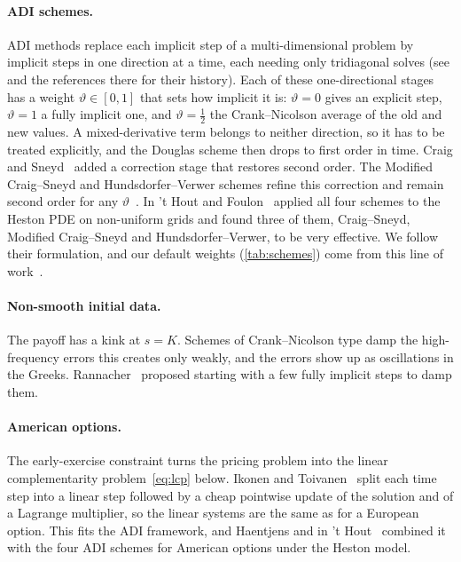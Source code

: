 \documentclass[11pt]{article}
\begin{document}
\paragraph{ADI schemes.}
ADI methods replace each implicit step of a multi-dimensional problem by implicit steps in one direction at a
time, each needing only tridiagonal solves (see \cite{inthout2010} and the references there for their
history). Each of these one-directional stages has a weight $\vartheta\in[0,1]$ that sets how implicit it is:
$\vartheta=0$ gives an explicit step, $\vartheta=1$ a fully implicit one, and $\vartheta=\tfrac12$ the
Crank--Nicolson average of the old and new values. A mixed-derivative term belongs to neither direction, so it has to be treated explicitly, and the
Douglas scheme then drops to first order in time. Craig and Sneyd~\cite{craig1988} added a correction stage
that restores second order. The Modified Craig--Sneyd and Hundsdorfer--Verwer schemes refine this correction
and remain second order for any $\vartheta$~\cite{inthout2010}. In 't Hout and
Foulon~\cite{inthout2010} applied all four schemes to the Heston PDE on non-uniform grids and found three of
them, Craig--Sneyd, Modified Craig--Sneyd and Hundsdorfer--Verwer, to be very effective. We follow their
formulation, and our default weights (\cref{tab:schemes}) come from this line of
work~\cite{inthout2010,haentjens2015}.

\paragraph{Non-smooth initial data.}
The payoff has a kink at $s=K$. Schemes of Crank--Nicolson type damp the high-frequency errors this creates only
weakly, and the errors show up as oscillations in the Greeks. Rannacher~\cite{rannacher1984} proposed starting
with a few fully implicit steps to damp them.

\paragraph{American options.}
The early-exercise constraint turns the pricing problem into the linear complementarity
problem~\eqref{eq:lcp} below. Ikonen and Toivanen~\cite{ikonen2009} split each time step into a linear step
followed by a cheap pointwise update of the solution and of a Lagrange multiplier, so the linear systems are
the same as for a European option. This fits the ADI framework, and Haentjens and in 't
Hout~\cite{haentjens2015} combined it with the four ADI schemes for American options under the Heston model.
\end{document}
